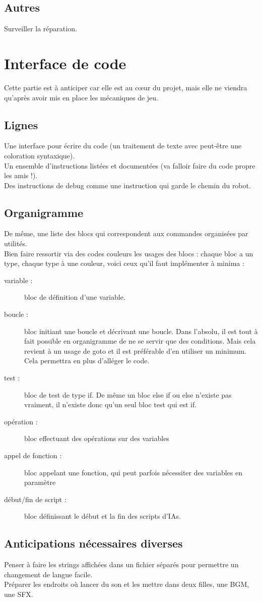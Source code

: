 \documentclass[10pt]{article}
\begin{document}
\subsection*{Autres}
Surveiller la réparation.

\section{Interface de code}

Cette partie est à anticiper car elle est au cœur du projet, mais elle ne viendra qu'après avoir mis en place les mécaniques de jeu.
\subsection*{Lignes}

Une interface pour écrire du code (un traitement de texte avec peut-être une coloration syntaxique).\\
Un ensemble d'instructions listées et documentées (va falloir faire du code propre les amis !).\\
Des instructions de debug comme une instruction qui garde le chemin du robot.

\subsection*{Organigramme}

De même, une liste des blocs qui correspondent aux commandes organisées par utilités.\\
Bien faire ressortir via des codes couleurs les usages des blocs : chaque bloc a un type, chaque type à une couleur, voici ceux qu'il faut implémenter à minima : 
\begin{description}
\item[variable :] bloc de définition d'une variable.
\item[boucle :] bloc initiant une boucle et décrivant une boucle. Dans l'absolu, il est tout à fait possible en organigramme de ne se servir que des conditions. Mais cela revient à un usage de goto et il est préférable d'en utiliser un minimum. Cela permettra en plus d'alléger le code.
\item[test :] bloc de test de type if. De même un bloc else if ou else n'existe pas vraiment, il n'existe donc qu'un seul bloc test qui est if.
\item[opération :] bloc effectuant des opérations sur des variables
\item[appel de fonction :] bloc appelant une fonction, qui peut parfois nécessiter des variables en paramètre
\item[début/fin de script :] bloc définissant le début et la fin des scripts d'IAs.
\end{description}

\subsection*{Anticipations nécessaires diverses}

Penser à faire les strings affichées dans un fichier séparés pour permettre un changement de langue facile.\\
Préparer les endroits où lancer du son et les mettre dans deux filles, une BGM, une SFX.\\
\end{document}
